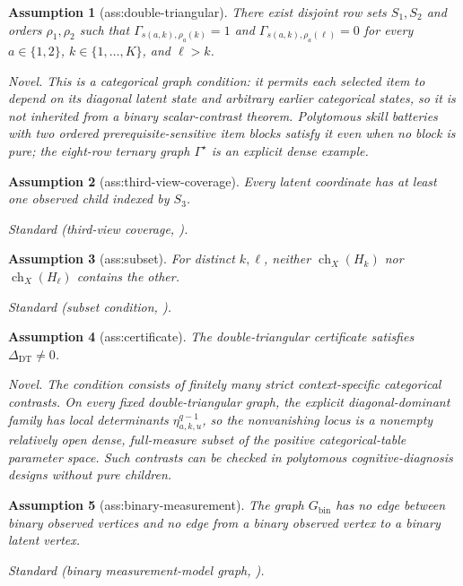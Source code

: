 \documentclass{article}
\newtheorem{assumption}{Assumption}
\begin{document}
\begin{assumption}[ass:double-triangular]\label{ass:double-triangular}
There exist disjoint row sets \(S_1,S_2\) and orders \(\rho_1,\rho_2\) such that \(\Gamma_{s(a,k),\rho_a(k)}=1\) and \(\Gamma_{s(a,k),\rho_a(\ell)}=0\) for every \(a\in\{1,2\}\), \(k\in\{1,\ldots,K\}\), and \(\ell>k\).
\par\smallskip\noindent\emph{Novel.} This is a categorical graph condition: it permits each selected item to depend on its diagonal latent state and arbitrary earlier categorical states, so it is not inherited from a binary scalar-contrast theorem. Polytomous skill batteries with two ordered prerequisite-sensitive item blocks satisfy it even when no block is pure; the eight-row ternary graph \(\Gamma^{\star}\) is an explicit dense example.
\end{assumption}

\begin{assumption}[ass:third-view-coverage]\label{ass:third-view-coverage}
Every latent coordinate has at least one observed child indexed by \(S_3\).
\par\smallskip\noindent\emph{Standard} (third-view coverage, \cite{LeeGu2026DTBLCM}).
\end{assumption}

\begin{assumption}[ass:subset]\label{ass:subset}
For distinct \(k,\ell\), neither \(\operatorname{ch}_X(H_k)\) nor \(\operatorname{ch}_X(H_\ell)\) contains the other.
\par\smallskip\noindent\emph{Standard} (subset condition, \cite{KivvaRajendranRavikumarAragam2021}).
\end{assumption}

\begin{assumption}[ass:certificate]\label{ass:certificate}
The double-triangular certificate satisfies \(\Delta_{\mathrm{DT}}\neq0\).
\par\smallskip\noindent\emph{Novel.} The condition consists of finitely many strict context-specific categorical contrasts. On every fixed double-triangular graph, the explicit diagonal-dominant family has local determinants \(\eta_{a,k,u}^{q-1}\), so the nonvanishing locus is a nonempty relatively open dense, full-measure subset of the positive categorical-table parameter space. Such contrasts can be checked in polytomous cognitive-diagnosis designs without pure children.
\end{assumption}

\begin{assumption}[ass:binary-measurement]\label{ass:binary-measurement}
The graph \(G_{\mathrm{bin}}\) has no edge between binary observed vertices and no edge from a binary observed vertex to a binary latent vertex.
\par\smallskip\noindent\emph{Standard} (binary measurement-model graph, \cite{LeeGu2026DTBLCM}).
\end{assumption}
\end{document}

